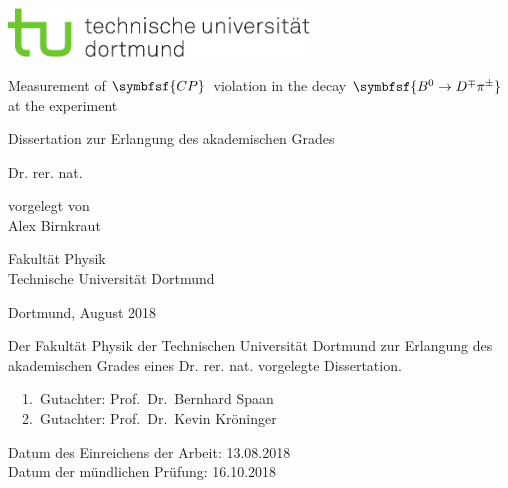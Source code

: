 
\begin{titlepage}
\includegraphics[width=8cm]{tud-logo-cmyk.pdf}
\vspace*{15ex}
{%
\Huge \sffamily \bfseries
\begin{center}
Measurement of $\symbfsf{C{}P}$\, violation in the decay $\symbfsf{\Bz\to D^\mp\pi^\pm}$ at the \lhcb experiment
\end{center}
}%

\begin{otherlanguage}{german}
{%
\LARGE \sffamily %
\begin{center}
Dissertation zur Erlangung des akademischen Grades\\
\end{center}
}

{%
\LARGE \sffamily %
\begin{center}
Dr. rer. nat.
\end{center}
}

\vspace{5ex}


{%
\Large \sffamily
\begin{center}
vorgelegt von \\[0.8ex]
Alex Birnkraut
\end{center}
}
\vspace{5ex}
{%
\Large \sffamily
\begin{center}
Fakultät Physik\\
Technische Universität Dortmund
\end{center}
}
\vspace{4ex}
{%
\Large \sffamily
\begin{center}
Dortmund, August 2018
\end{center}
}

\clearpage
\thispagestyle{empty}
\vspace*{\fill}
\noindent Der Fakultät Physik der Technischen Universität Dortmund zur Erlangung
des akademischen Grades eines Dr. rer. nat. vorgelegte
Dissertation.\\

\parbox{\textwidth}{
  1.~Gutachter: Prof.~Dr.~Bernhard Spaan \\
  2.~Gutachter: Prof.~Dr.~Kevin Kröninger\\
}
\noindent Datum des Einreichens der Arbeit: 13.08.2018\\
\noindent Datum der mündlichen Prüfung: 16.10.2018
\end{otherlanguage}
\end{titlepage}
\setcounter{page}{1}
